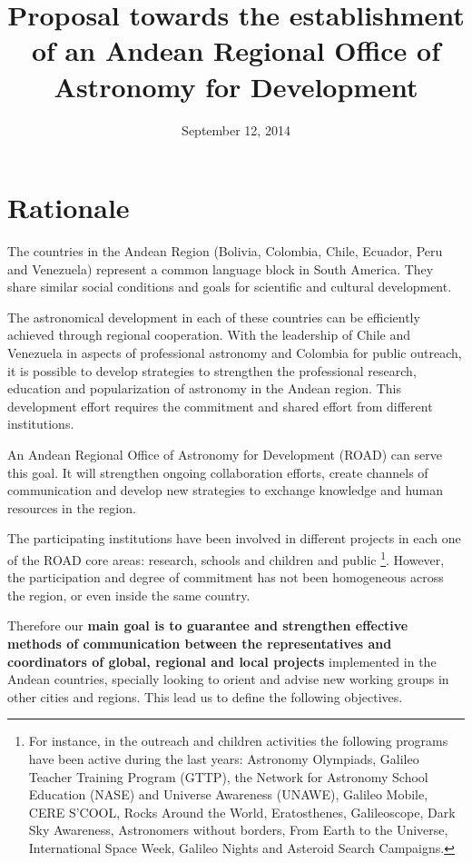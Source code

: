 \documentclass[12pt]{article}
\title{Proposal towards the establishment of an Andean Regional Office of
  Astronomy for Development}
\date{September 12, 2014}
\begin{document}
\maketitle
\tableofcontents
\newpage

\section{Rationale}

The countries in the Andean Region (Bolivia, Colombia, Chile, Ecuador,
Peru and Venezuela) represent a common language block in South
America. They share similar social conditions and goals for scientific
and cultural development.  

The astronomical development in each of these countries can be
efficiently achieved through regional cooperation. With the leadership
of Chile and Venezuela in aspects of professional astronomy and
Colombia for public outreach, it is possible to develop strategies to
strengthen the professional research, education and popularization of
astronomy in the Andean region. This development effort requires the
commitment and shared effort from different institutions. 

An Andean Regional Office of Astronomy for Development (ROAD) can
serve this goal.  It will strengthen ongoing collaboration efforts,
create channels of communication and develop new strategies to
exchange knowledge and human resources in the region.  


The participating institutions have been involved in different
projects in each one of the ROAD core areas: research, schools and
children and public \footnote{For instance, in the outreach and children activities
  the following programs have been active during the last years: Astronomy Olympiads, Galileo Teacher Training
  Program (GTTP), the Network for Astronomy School Education (NASE)
  and Universe Awareness (UNAWE), Galileo Mobile, CERE S'COOL, Rocks
  Around the World, Eratosthenes, Galileoscope, Dark Sky Awareness,
  Astronomers without borders, From Earth to the Universe,
  International Space Week, Galileo Nights and Asteroid Search
  Campaigns.}. However, the participation and degree of commitment
has not been homogeneous across the region, or even inside the same
country. 

Therefore our {\bf main goal is to guarantee and strengthen effective
  methods of communication between the representatives and
  coordinators of global, regional and local projects} implemented  in
the Andean countries, specially looking to orient and advise new
working groups in  other cities and regions. This lead us to define
the following objectives.
\end{document}

